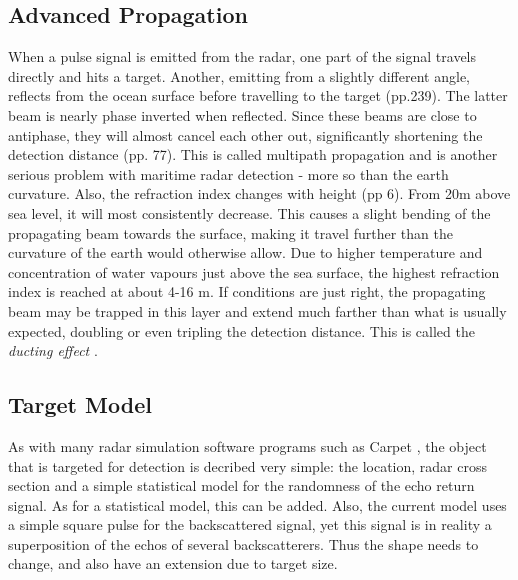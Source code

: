 \documentclass[letterpaper]{book}
\begin{document}
\subsection{Advanced Propagation}
When a pulse signal is emitted from the radar, one part of the signal travels directly and hits a target. Another, emitting from a slightly different angle, reflects from the ocean surface before travelling to the target \cite{ref:skolnik} (pp.239). The latter beam is nearly phase inverted when reflected. Since these beams are close to antiphase, they will almost cancel each other out, significantly shortening the detection distance \cite{ref:levanon} (pp. 77). This is called multipath propagation and is another serious problem with maritime radar detection - more so than the earth curvature. Also, the refraction index changes with height \cite{ref:levanon} (pp 6). From 20m above sea level, it will most consistently decrease. This causes a slight bending of the propagating beam towards the surface, making it travel further than the curvature of the earth would otherwise allow. Due to higher temperature and concentration of water vapours just above the sea surface, the highest refraction index is reached at about 4-16 m. If conditions are just right, the propagating beam may be trapped in this layer and extend much farther than what is usually expected, doubling or even tripling the detection distance. This is called the \textit{ducting effect} \cite{ref:anderson}.

\subsection{Target Model}
As with many radar simulation software programs such as Carpet \cite{ref:carpet}, the object that is targeted for detection is decribed very simple: the location, radar cross section and a simple statistical model for the randomness of the echo return signal. As for a statistical model, this can be added. Also, the current model uses a simple square pulse for the backscattered signal, yet this signal is in reality a superposition of the echos of several backscatterers. Thus the shape needs to change, and also have an extension due to target size.
\end{document}
